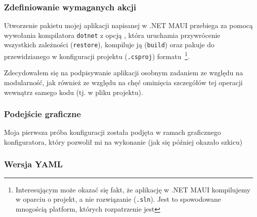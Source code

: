 \subsubsection{Zdefiniowanie wymaganych akcji}
Utworzenie pakietu mojej aplikacji napisanej w .NET MAUI przebiega za pomocą wywołania kompilatora 
\verb|dotnet| z opcją , 
która uruchamia przywrócenie wszystkich zależności (\verb|restore|), 
kompiluje ją (\verb|build|) oraz pakuje do przewidzianego w konfiguracji projektu (\verb|.csproj|) formatu~\cprotect\footnote{%
    Interesującym może okazać się fakt, że aplikację w .NET MAUI kompilujemy w oparciu o projekt, a nie rozwiązanie (\verb|.sln|).
    Jest to spowodowane mnogością platform, których rozpatrzenie jest 
}.

Zdecydowałem się na podpisywanie aplikacji osobnym zadaniem ze względu na modularność,
jak również ze względu na chęć ominięcia szczegółów tej operacji wewnątrz samego kodu (tj. w pliku projektu).

\subsubsection{Podejście graficzne}
Moja pierwsza próba konfiguracji została podjęta w ramach graficznego konfiguratora, 
który pozwolił mi na wykonanie (jak się później okazało szkicu) 

\subsubsection{Wersja YAML}
